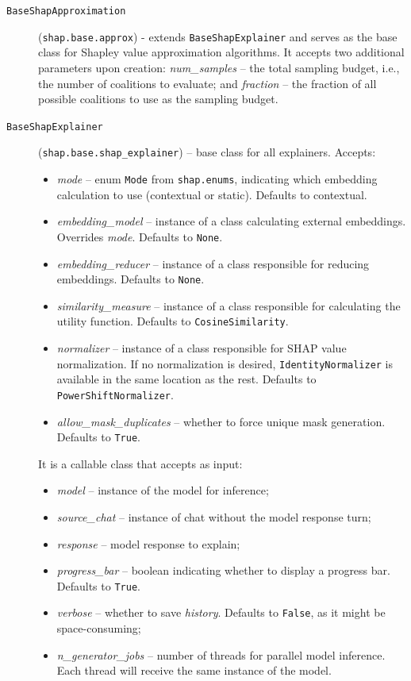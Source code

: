 \begin{appendices}
\begin{description}
    \item[\texttt{BaseShapApproximation}] (\texttt{shap.base.approx}) - extends \texttt{BaseShapExplainer} and serves as the base class for Shapley value approximation algorithms. It accepts two additional parameters upon creation: \textit{num\_samples} -- the total sampling budget, i.e., the number of coalitions to evaluate; and \textit{fraction} -- the fraction of all possible coalitions to use as the sampling budget.

    \item[\texttt{BaseShapExplainer}] (\texttt{shap.base.shap\_explainer}) -- base class for all explainers. Accepts:
        \begin{itemize}
            \item \textit{mode} -- enum \texttt{Mode} from \texttt{shap.enums}, indicating which embedding calculation to use (contextual or static). Defaults to contextual.
            \item \textit{embedding\_model} -- instance of a class calculating external embeddings. Overrides \textit{mode}. Defaults to \texttt{None}.
            \item \textit{embedding\_reducer} -- instance of a class responsible for reducing embeddings. Defaults to \texttt{None}.
            \item \textit{similarity\_measure} -- instance of a class responsible for calculating the utility function. Defaults to \texttt{CosineSimilarity}.
            \item \textit{normalizer} -- instance of a class responsible for SHAP value normalization. If no normalization is desired, \texttt{IdentityNormalizer} is available in the same location as the rest. Defaults to \texttt{PowerShiftNormalizer}.
            \item \textit{allow\_mask\_duplicates} -- whether to force unique mask generation. Defaults to \texttt{True}.
        \end{itemize}
    It is a callable class that accepts as input:
        \begin{itemize}
            \item \textit{model} -- instance of the model for inference;
            \item \textit{source\_chat} -- instance of chat without the model response turn;
            \item \textit{response} -- model response to explain;
            \item \textit{progress\_bar} -- boolean indicating whether to display a progress bar. Defaults to \texttt{True}.
            \item \textit{verbose} -- whether to save \textit{history}. Defaults to \texttt{False}, as it might be space-consuming;
            \item \textit{n\_generator\_jobs} -- number of threads for parallel model inference. Each thread will receive the same instance of the model.
        \end{itemize}


\end{description}
\end{appendices}
